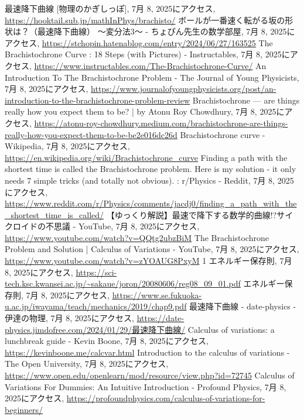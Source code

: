 \documentclass[12pt,a4paper]{ltjsarticle}
\begin{document}
\begin{thebibliography}{99}
\raggedright
{} 最速降下曲線 [物理のかぎしっぽ], 7月 8, 2025にアクセス, \url{https://hooktail.sub.jp/mathInPhys/brachisto/}
 ボールが一番速く転がる坂の形状は？（最速降下曲線） ～変分法3～ - ちょぴん先生の数学部屋, 7月 8, 2025にアクセス, \url{https://stchopin.hatenablog.com/entry/2024/06/27/163525}
 The Brachistochrone Curve : 18 Steps (with Pictures) - Instructables, 7月 8, 2025にアクセス, \url{https://www.instructables.com/The-Brachistochrone-Curve/}
 An Introduction To The Brachistochrone Problem - The Journal of Young Physicists, 7月 8, 2025にアクセス, \url{https://www.journalofyoungphysicists.org/post/an-introduction-to-the-brachistochrone-problem-review}
 Brachistochrone — are things really how you expect them to be? | by Atonu Roy Chowdhury, 7月 8, 2025にアクセス, \url{https://atonu-roy-chowdhury.medium.com/brachistochrone-are-things-really-how-you-expect-them-to-be-be2e016dc26d}
 Brachistochrone curve - Wikipedia, 7月 8, 2025にアクセス, \url{https://en.wikipedia.org/wiki/Brachistochrone_curve}
 Finding a path with the shortest time is called the Brachistochrone problem. Here is my solution - it only needs 7 simple tricks (and totally not obvious). : r/Physics - Reddit, 7月 8, 2025にアクセス, \url{https://www.reddit.com/r/Physics/comments/jacdj0/finding_a_path_with_the_shortest_time_is_called/}
 【ゆっくり解説】最速で降下する数学的曲線!?サイクロイドの不思議 - YouTube, 7月 8, 2025にアクセス, \url{https://www.youtube.com/watch?v=QQtg2ubzBiM}
 The Brachistochrone Problem and Solution | Calculus of Variations - YouTube, 7月 8, 2025にアクセス, \url{https://www.youtube.com/watch?v=zYOAUG8PxyM}
 1 エネルギー保存則, 7月 8, 2025にアクセス, \url{https://sci-tech.ksc.kwansei.ac.jp/~sakaue/joron/20080606/reg08_09_01.pdf}
 エネルギー保存則, 7月 8, 2025にアクセス, \url{https://www.se.fukuoka-u.ac.jp/iwayama/teach/mechanics/2019/chap9.pdf}
 最速降下曲線 - date-physics - 伊達の物理, 7月 8, 2025にアクセス, \url{https://date-physics.jimdofree.com/2024/01/29/最速降下曲線/}
 Calculus of variations: a lunchbreak guide - Kevin Boone, 7月 8, 2025にアクセス, \url{https://kevinboone.me/calcvar.html}
 Introduction to the calculus of variations - The Open University, 7月 8, 2025にアクセス, \url{https://www.open.edu/openlearn/mod/resource/view.php?id=72745}
 Calculus of Variations For Dummies: An Intuitive Introduction - Profound Physics, 7月 8, 2025にアクセス, \url{https://profoundphysics.com/calculus-of-variations-for-beginners/}

\end{thebibliography}
\end{document}
